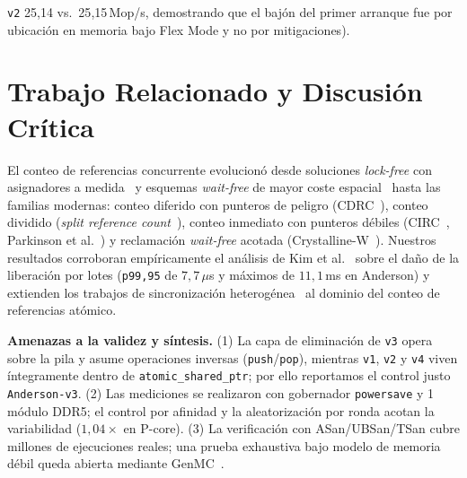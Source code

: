 \documentclass[10pt,twocolumn,a4paper]{article}
\begin{document}
\texttt{v2} 25{,}14 vs.\ 25{,}15\,Mop/s, demostrando que el bajón del primer arranque fue por ubicación en memoria bajo Flex Mode y no por mitigaciones).

\section{Trabajo Relacionado y Discusión Crítica}

El conteo de referencias concurrente evolucionó desde soluciones \emph{lock-free} con asignadores a medida~\cite{detlefs2001lockfree} y esquemas \emph{wait-free} de mayor coste espacial~\cite{sundell2005waitfree} hasta las familias modernas: conteo diferido con punteros de peligro (CDRC~\cite{anderson2021cdrc,anderson2022turning}), conteo dividido (\emph{split reference count}~\cite{lee2010fast,williams2012concurrency,folly2024}), conteo inmediato con punteros débiles (CIRC~\cite{jung2024circ}, Parkinson et al.~\cite{parkinson2023weak}) y reclamación \emph{wait-free} acotada (Crystalline-W~\cite{nikolaev2024crystalline}). Nuestros resultados corroboran empíricamente el análisis de Kim et al.~\cite{kim2024epochs} sobre el daño de la liberación por lotes (\texttt{p99,95} de $7{,}7\,\mu$s y máximos de $11{,}1$\,ms en Anderson) y extienden los trabajos de sincronización heterogénea~\cite{liu2022libasl,ouyang2022coreaware,schone2024alderlake} al dominio del conteo de referencias atómico.

\textbf{Amenazas a la validez y síntesis.} (1) La capa de eliminación de \texttt{v3} opera sobre la pila y asume operaciones inversas (\texttt{push}/\texttt{pop}), mientras \texttt{v1}, \texttt{v2} y \texttt{v4} viven íntegramente dentro de \texttt{atomic\_shared\_ptr}; por ello reportamos el control justo \texttt{Anderson-v3}. (2) Las mediciones se realizaron con gobernador \texttt{powersave} y 1 módulo DDR5; el control por afinidad y la aleatorización por ronda acotan la variabilidad ($1{,}04\times$ en P-core). (3) La verificación con ASan/UBSan/TSan cubre millones de ejecuciones reales; una prueba exhaustiva bajo modelo de memoria débil queda abierta mediante GenMC~\cite{kokologiannakis2021genmc}.
\end{document}
